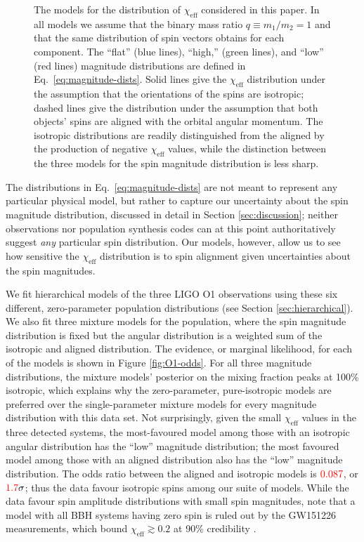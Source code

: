 \documentclass[modern,linenumbers]{aastex61}
\newcommand{\chieff}{\chi_\mathrm{eff}}
\newcommand{\checkme}[1]{\textcolor{red}{#1}}
\newcommand{\OOneSigmaIsoAligned}{\checkme{1.7}}
\newcommand{\OOneOddsIsoAligned}{\checkme{0.087}}
\begin{document}
\begin{figure}
  \caption{\label{fig:chieff-distribution-models} The models for the
    distribution of $\chieff$ considered in this paper.  In all models
    we assume that the binary mass ratio $q \equiv m_1/m_2 = 1$ and
    that the same distribution of spin vectors obtains for each
    component.  The ``flat'' (blue lines), ``high,'' (green
    lines), and ``low'' (red lines) magnitude distributions are
    defined in Eq.\ \eqref{eq:magnitude-dists}.  Solid lines give the
    $\chieff$ distribution under the assumption that the orientations
    of the spins are isotropic; dashed lines give the distribution
    under the assumption that both objects' spins are aligned with the
    orbital angular momentum.  The isotropic distributions are readily
    distinguished from the aligned by the production of negative
    $\chieff$ values, while the distinction between the three models
    for the spin magnitude distribution is less sharp.}
\end{figure}

The distributions in Eq.\ \eqref{eq:magnitude-dists} are not meant to
represent any particular physical model, but rather to capture our
uncertainty about the spin magnitude distribution, discussed in detail
in Section \ref{sec:discussion}; neither observations nor population
synthesis codes can at this point authoritatively suggest {\it any}
particular spin distribution.  Our models, however, allow us to see
how sensitive the $\chieff$ distribution is to spin alignment given
uncertainties about the spin magnitudes.

We fit hierarchical models of the three LIGO O1 observations using
these six different, zero-parameter population distributions (see
Section \ref{sec:hierarchical}).  We also fit three mixture models for
the population, where the spin magnitude distribution is fixed but the
angular distribution is a weighted sum of the isotropic and aligned
distribution.  The evidence, or marginal likelihood, for each of the
models is shown in Figure \ref{fig:O1-odds}.  For all three magnitude
distributions, the mixture models' posterior on the mixing fraction
peaks at 100\% isotropic, which explains why the zero-parameter,
pure-isotropic models are preferred over the single-parameter mixture
models for every magnitude distribution with this data set.  Not
surprisingly, given the small $\chieff$ values in the three detected
systems, the most-favoured model among those with an isotropic angular
distribution has the ``low'' magnitude distribution; the most favoured
model among those with an aligned distribution also has the ``low''
magnitude distribution.  The odds ratio between the aligned and
isotropic models is $\OOneOddsIsoAligned$, or
$\OOneSigmaIsoAligned\sigma$; thus the data favour isotropic spins
among our suite of models.  While the data favour spin amplitude
distributions with small spin magnitudes, note that a model with all
\ac{BBH} systems having zero spin is ruled out by the GW151226
measurements, which bound $\chieff \gtrsim 0.2$ at 90\% credibility
\citep{2016PhRvL.116x1103A}.
\end{document}
